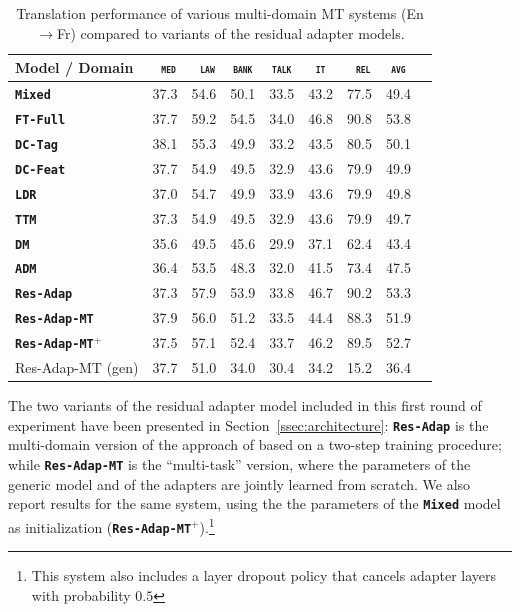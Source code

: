 \documentclass[11pt,a4paper]{article}
\newcommand{\domain}[1]{\texttt{\textsc{#1}}}
\newcommand{\system}[1]{\texttt{\textbf{#1}}}
\begin{document}
\begin{table}[t!]
  \centering
  \begin{tabular}{|p{3.5cm}|*{8}{r|}} \hline
    Model / Domain & \multicolumn{1}{c|}{\domain{ med}} & \multicolumn{1}{c|}{\domain{ law}} & \multicolumn{1}{c|}{\domain{bank}} & \multicolumn{1}{c|}{\domain{talk}} & \multicolumn{1}{c|}{\domain{ it }} & \multicolumn{1}{c|}{\domain{ rel}} & \multicolumn{1}{c|}{\domain{avg}} \\ \hline 
    \system{Mixed}        & 37.3 & 54.6 & 50.1 & 33.5 & 43.2 & 77.5  &  49.4 \\
    \system{FT-Full}       & 37.7 & 59.2 & 54.5 & 34.0 & 46.8 & 90.8 & 53.8 \\
    \hline 
    \system{DC-Tag}      & 38.1 & 55.3 & 49.9   & 33.2 & 43.5 & 80.5  & 50.1 \\
    \system{DC-Feat}     & 37.7 & 54.9 & 49.5   & 32.9 & 43.6 & 79.9 & 49.9  \\
    \system{LDR}            & 37.0  & 54.7 & 49.9 & 33.9 & 43.6 & 79.9 & 49.8    \\
    \system{TTM}           & 37.3  & 54.9 & 49.5 & 32.9 & 43.6 & 79.9 & 49.7   \\
    \system{DM}            & 35.6  & 49.5  & 45.6 & 29.9 & 37.1 & 62.4 & 43.4   \\ 
    \system{ADM}          & 36.4  & 53.5  & 48.3 & 32.0 & 41.5 & 73.4 & 47.5   \\
    \hline
    \system{Res-Adap}         & 37.3 & 57.9 & 53.9 & 33.8 & 46.7 & 90.2 & 53.3 \\ 
    \system{Res-Adap-MT}  & 37.9 & 56.0 & 51.2  & 33.5 & 44.4 & 88.3 & 51.9 \\
    \system{Res-Adap-MT}$^{+}$ & 37.5 & 57.1 & 52.4 & 33.7 & 46.2 & 89.5 & 52.7 \\
    \hfill {Res-Adap-MT} (gen)    & 37.7 & 51.0 & 34.0 & 30.4 & 34.2 & 15.2 & 36.4 \\
    \hline
  \end{tabular}
  \caption{Translation performance of various multi-domain MT systems (En$\rightarrow$Fr) compared to variants of the residual adapter models.}
  \label{tab:performance-multi}
\end{table}
The two variants of the residual adapter model included in this first round of experiment have been presented in Section~\ref{ssec:architecture}: \system{Res-Adap} is the multi-domain version of the approach of \citet{Bapna19simple} based on a two-step training procedure; while \system{Res-Adap-MT} is the ``multi-task'' version, where the parameters of the generic model and of the adapters are jointly learned from scratch. We also report results for the same system, using the the parameters of the \system{Mixed} model as initialization (\system{Res-Adap-MT}${^+}$).\footnote{This system also includes a layer dropout policy that cancels adapter layers with probability $0.5$} 
\end{document}
